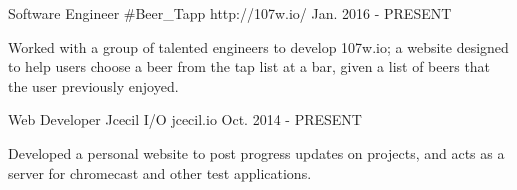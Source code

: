


\begin{cventries}


\cventry
{Software Engineer} %
{\#Beer\_Tapp} %
{http://107w.io/} %
{Jan. 2016 - PRESENT} %
{ %
\begin{cvitems}
\item {Worked with a group of talented engineers to develop 107w.io; a website designed to help users choose a beer from the tap list at a bar, given a list of beers that the user previously enjoyed.}
\end{cvitems}
}


\cventry
{Web Developer} %
{Jcecil I/O} %
{jcecil.io} %
{Oct. 2014 - PRESENT} %
{ %
\begin{cvitems}
\item {Developed a personal website to post progress updates on projects, and acts as a server for chromecast and other test applications.} 
\end{cvitems}
}


\end{cventries}

